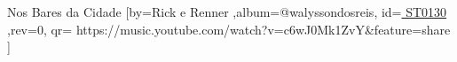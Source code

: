 \beginsong
{Nos Bares da Cidade %
}[by={Rick e Renner %
},album={@walyssondosreis},
id={\href{ https://music.youtube.com/watch?v=c6wJ0Mk1ZvY&feature=share
}{ ST0130  %
}},rev={0}, %
qr={ https://music.youtube.com/watch?v=c6wJ0Mk1ZvY&feature=share %
}]
\beginverse
